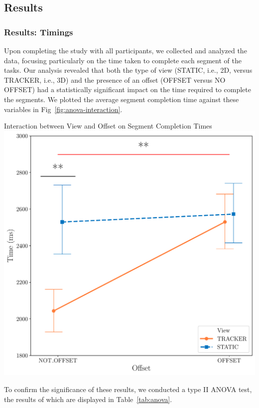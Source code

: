 \subsection{Results}
\subsubsection{Results: Timings}
Upon completing the study with all participants, we collected and analyzed the data, focusing particularly on the time taken to complete each segment of the tasks. Our analysis revealed that both the type of view (STATIC, i.e., 2D, versus TRACKER, i.e., 3D) and the presence of an offset (OFFSET versus NO OFFSET) had a statistically significant impact on the time required to complete the segments. We plotted the average segment completion time against these variables in Fig~\ref{fig:anova-interaction}.

\begin{figureBox}[label={fig:anova-interaction}, width=0.8\linewidth]{Interaction between View and Offset on Segment Completion Times}
    \includegraphics[width = 1.0\linewidth]{./evaluation/figures/survery/anova-interaction.pdf}
\end{figureBox}

To confirm the significance of these results, we conducted a type II ANOVA test, the results of which are displayed in Table~\ref{tab:anova}. \\

